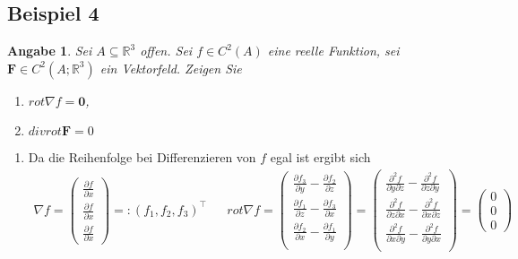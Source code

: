 \documentclass[]{article}
\newtheorem*{angabe*}{Angabe}
\begin{document}
\subsection*{Beispiel 4}
\begin{angabe*}
	Sei $A \subseteq \mathbb{R}^3$ offen. Sei $f\in C^2(A)$ eine reelle Funktion, sei $\bm{F} \in C^2(A;\mathbb{R}^3)$ ein Vektorfeld. Zeigen Sie
	\begin{enumerate}[label=(\roman*)]
		\item $rot\nabla f = \bm{0}$,
		\item $div rot \bm{F} = 0$
	\end{enumerate}
\end{angabe*}

\begin{enumerate}[label=(\roman*)]
	\item Da die Reihenfolge bei Differenzieren von $f$ egal ist ergibt sich
	\begin{align*}
		\nabla f = \begin{pmatrix}
			\frac{\partial f}{\partial x} \\ \frac{\partial f}{\partial x} \\ \frac{\partial f}{\partial x}
		\end{pmatrix} =: (f_1, f_2, f_3)^\top &&
		rot \nabla f = \begin{pmatrix}
			\frac{\partial f_3}{\partial y} - \frac{\partial f_2}{\partial z}\\
			\frac{\partial f_1}{\partial z} - \frac{\partial f_3}{\partial x}\\
			\frac{\partial f_2}{\partial x} - \frac{\partial f_1}{\partial y}\\
		\end{pmatrix} = \begin{pmatrix} 
		\frac{\partial^2 f}{\partial y \partial z} - \frac{\partial^2 f}{\partial z \partial y}\\
		\frac{\partial^2 f}{\partial z \partial x} - \frac{\partial^2 f}{\partial x \partial z}\\
		\frac{\partial^2 f}{\partial x \partial y} - \frac{\partial^2 f}{\partial y \partial x}\\
		\end{pmatrix} = \begin{pmatrix}
			0 \\ 0 \\ 0
		\end{pmatrix}
	\end{align*}


\end{enumerate}
\end{document}
